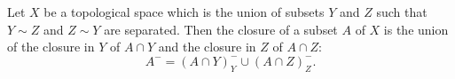 Let $X$ be a topological space which is the union of subsets $Y$ and $Z$ such that $Y \sim Z$ and $Z \sim Y$ are separated. Then the closure of a subset $A$ of $X$ is the union of the closure in $Y$ of $A \cap Y$ and the closure in $Z$ of $A \cap Z$:
$$A^{-} = (A \cap Y)^{-}_{Y} \cup (A \cap Z)^{-}_{Z}.$$
